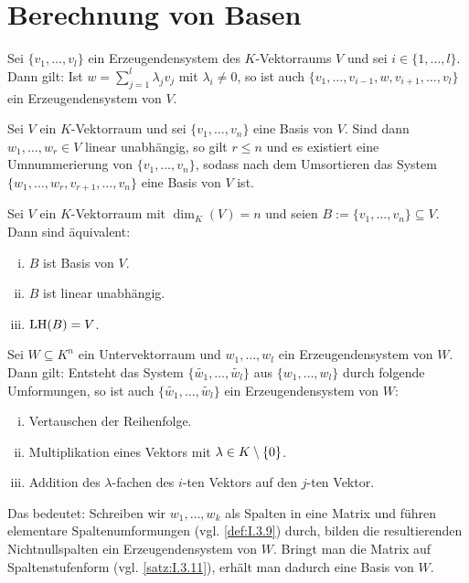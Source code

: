 \section{Berechnung von Basen}

\begin{lemma}[Austauschlemma]
	\label{lemma:I.9.1}
	Sei $\{v_1,\dots,v_l\}$ ein Erzeugendensystem des $K$-Vektorraums $V$ und sei $i \in \{1,\dots,l\}$.
	Dann gilt:
	Ist $w = \sum_{j=1}^{l} \lambda_j v_j$ mit $\lambda_i \neq 0$, so ist auch $\{v_1,\dots,v_{i-1},w,v_{i+1},\dots,v_l\}$ ein Erzeugendensystem von $V$.
\end{lemma}

\begin{satz}[Basisergänzungssatz]
	\label{satz:I.9.2}
	Sei $V$ ein $K$-Vektorraum und sei $\{v_1,\dots,v_n\}$ eine Basis von $V$.
	Sind dann $w_1,\dots,w_r \in V$ linear unabhängig, so gilt $r \leq n$ und es existiert eine Umnummerierung von $\{v_1,\dots,v_n\}$, sodass nach dem Umsortieren das System $\{w_1,\dots,w_r,v_{r+1},\dots,v_n\}$ eine Basis von $V$ ist.
\end{satz}

\begin{satz}
	\label{satz:I.9.3}
	Sei $V$ ein $K$-Vektorraum mit $\dim_K(V) = n$ und seien $B := \{v_1,\dots,v_n\} \subseteq V$.
	Dann sind äquivalent:
	\begin{enumerate}[(i)]
		\item $B$ ist Basis von $V$.
		\item $B$ ist linear unabhängig.
		\item $\operatorname{LH}(B) = V$.
	\end{enumerate}
\end{satz}

\begin{satz}
	\label{satz:I.9.4}
	Sei $W \subseteq K^n$ ein Untervektorraum und $w_1,\dots,w_l$ ein Erzeugendensystem von $W$.
	Dann gilt:
	Entsteht das System $\{\widetilde{w_1},\dots,\widetilde{w_l}\}$ aus $\{w_1,\dots,w_l\}$ durch folgende Umformungen, so ist auch $\{\widetilde{w_1},\dots,\widetilde{w_l}\}$ ein Erzeugendensystem von $W$:
	\begin{enumerate}[(i)]
		\item Vertauschen der Reihenfolge.
		\item Multiplikation eines Vektors mit $\lambda \in K \setminus \{0\}$.
		\item Addition des $\lambda$-fachen des $i$-ten Vektors auf den $j$-ten Vektor.
	\end{enumerate}
	Das bedeutet:
	Schreiben wir $w_1,\dots,w_k$ als Spalten in eine Matrix und führen elementare Spaltenumformungen (vgl. \autoref{def:I.3.9}) durch, bilden die resultierenden Nichtnullspalten ein Erzeugendensystem von $W$.
	Bringt man die Matrix auf Spaltenstufenform (vgl. \autoref{satz:I.3.11}), erhält man dadurch eine Basis von $W$.
\end{satz}

